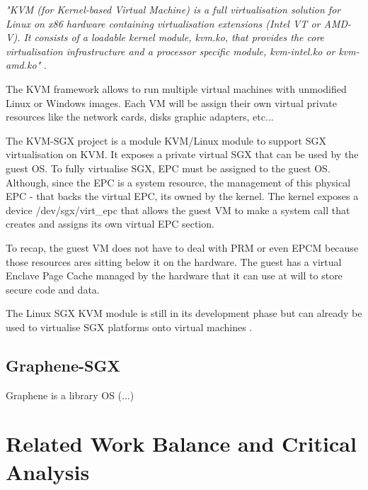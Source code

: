 \textit{"\gls{KVM} (for Kernel-based Virtual Machine) is a full virtualisation solution for Linux on x86 hardware containing virtualisation extensions (Intel VT or AMD-V). It consists of a loadable kernel module, kvm.ko, that provides the core virtualisation infrastructure and a processor specific module, kvm-intel.ko or kvm-amd.ko"} \cite{kvm:1}.

The \gls{KVM} framework allows to run multiple virtual machines with unmodified Linux or Windows images. Each \gls{VM} will be assign their own virtual private resources like the network cards, disks graphic adapters, etc...

The KVM-SGX project is a module KVM/Linux module to support SGX virtualisation on \gls{KVM}. It exposes a private virtual SGX that can be used by the guest \gls{OS}.
To fully virtualise \gls{SGX}, \gls{EPC} must be assigned to the guest \gls{OS}. Although, since the \gls{EPC} is a system resource, the management of this physical \gls{EPC} - that backs the virtual \gls{EPC}, its owned by the kernel. The kernel exposes a device /dev/sgx/virt\_epc that allows the guest \gls{VM} to make a system call that creates and assigns its own virtual \gls{EPC} section.

To recap, the guest \gls{VM} does not have to deal with \gls{PRM} or even \gls{EPCM} because those resources ares sitting below it on the hardware. The guest has a virtual Enclave Page Cache managed by the hardware that it can use at will to store secure code and data.

The Linux \gls{SGX} \gls{KVM} module is still in its development phase but can already be used to virtualise \gls{SGX} platforms onto virtual machines \cite{kvm-sgx:1, kvm-sgx:2, kvm-sgx:3}.

\subsection{Graphene-SGX}
\label{ssec:graphene-sgx}

Graphene is a library OS (...)

\section{Related Work Balance and Critical Analysis}
\label{sec:related_work_balance_and_critical_analysis}

